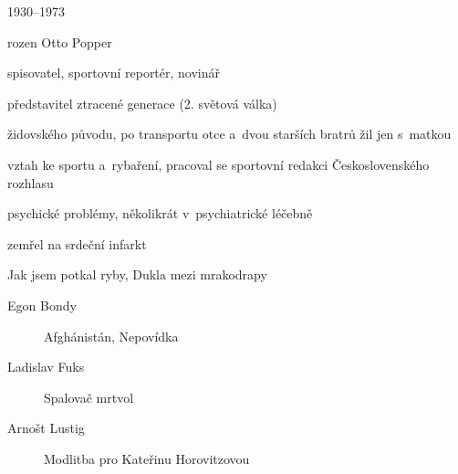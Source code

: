 {\parag{\getauthor}
\begin{compactitem}
	\item 1930--1973
	\item rozen Otto Popper
	\item spisovatel, sportovní reportér, novinář
	\item představitel ztracené generace (2. světová válka)
	\item židovského původu, po transportu otce a~dvou starších bratrů žil jen s~matkou
	\item vztah ke sportu a~rybaření, pracoval se sportovní redakci Československého rozhlasu
	\item psychické problémy, několikrát v~psychiatrické léčebně
	\item zemřel na srdeční infarkt
	\item Jak jsem potkal ryby, Dukla mezi mrakodrapy
\end{compactitem}

\begin{description}
	\item[Egon Bondy] Afghánistán, Nepovídka
	\item[Ladislav Fuks] Spalovač mrtvol
	\item[Arnošt Lustig] Modlitba pro Kateřinu Horovitzovou
\end{description}
}
